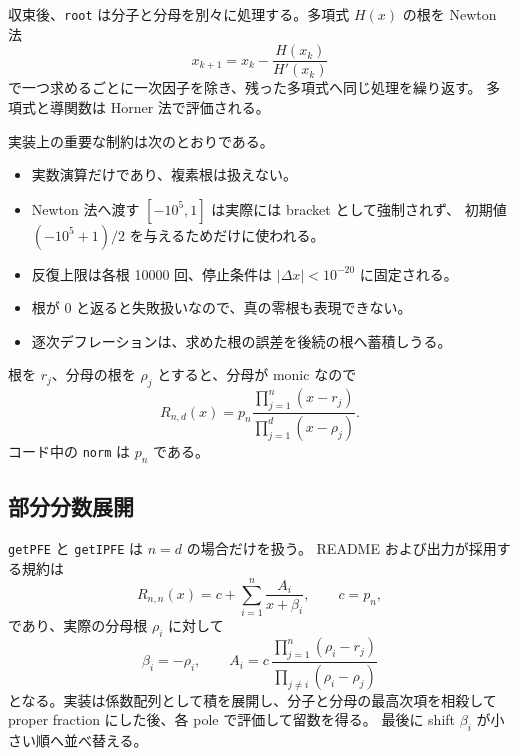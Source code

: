 \documentclass[a4paper,11pt]{ltjsarticle}
\newcommand{\code}[1]{\texttt{#1}}
\begin{document}
収束後、\code{root} は分子と分母を別々に処理する。多項式 \(H(x)\) の根を
Newton 法
\begin{equation}
  x_{k+1}=x_k-\frac{H(x_k)}{H'(x_k)}
\end{equation}
で一つ求めるごとに一次因子を除き、残った多項式へ同じ処理を繰り返す。
多項式と導関数は Horner 法で評価される。

実装上の重要な制約は次のとおりである。

\begin{itemize}
  \item 実数演算だけであり、複素根は扱えない。
  \item Newton 法へ渡す \([-10^5,1]\) は実際には bracket として強制されず、
        初期値 \((-10^5+1)/2\) を与えるためだけに使われる。
  \item 反復上限は各根 10000 回、停止条件は \(|\Delta x|<10^{-20}\) に固定される。
  \item 根が 0 と返ると失敗扱いなので、真の零根も表現できない。
  \item 逐次デフレーションは、求めた根の誤差を後続の根へ蓄積しうる。
\end{itemize}

根を \(r_j\)、分母の根を \(\rho_j\) とすると、分母が monic なので
\begin{equation}
  R_{n,d}(x)=p_n
  \frac{\prod_{j=1}^{n}(x-r_j)}
       {\prod_{j=1}^{d}(x-\rho_j)}.
  \label{eq:factor}
\end{equation}
コード中の \code{norm} は \(p_n\) である。

\subsection{部分分数展開}

\code{getPFE} と \code{getIPFE} は \(n=d\) の場合だけを扱う。
README および出力が採用する規約は
\begin{equation}
 R_{n,n}(x)=c+\sum_{i=1}^{n}\frac{A_i}{x+\beta_i},
 \qquad c=p_n,
 \label{eq:pfe}
\end{equation}
であり、実際の分母根 \(\rho_i\) に対して
\begin{equation}
  \beta_i=-\rho_i,
  \qquad
  A_i=c\,
  \frac{\prod_{j=1}^{n}(\rho_i-r_j)}
       {\prod_{j\ne i}(\rho_i-\rho_j)}
  \label{eq:residue}
\end{equation}
となる。実装は係数配列として積を展開し、分子と分母の最高次項を相殺して
proper fraction にした後、各 pole で評価して留数を得る。
最後に shift \(\beta_i\) が小さい順へ並べ替える。
\end{document}
